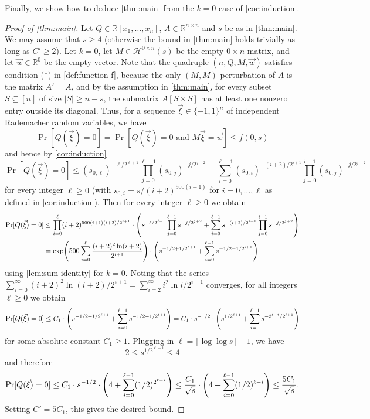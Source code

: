 \documentclass[english]{article}
\theoremstyle{remark}
\numberwithin{equation}{section}
\numberwithin{figure}{section}
\newcommand{\su}{\subseteq}
\newcommand{\RR}{\mathbb{R}}
\let\originalleft\left
\let\originalright\right
\renewcommand{\left}{\mathopen{}\mathclose\bgroup\originalleft}
\renewcommand{\right}{\aftergroup\egroup\originalright}
\begin{document}
Finally, we show how to deduce \cref{thm:main} from the $k=0$ case of \cref{cor:induction}.
\begin{proof}[Proof of \cref{thm:main}]
Let $Q\in \RR[x_1,\dots,x_n]$, $A\in \RR^{n\times n}$ and $s$ be as in \cref{thm:main}. We may assume that $s\ge 4$ (otherwise the bound in \cref{thm:main} holds trivially as long as $C'\ge 2$). Let $k=0$, let $M\in \mathcal{H}^{0\times n}(s)$ be the empty $0\times n$ matrix, and let $\vec w\in \RR^0$ be the empty vector. Note that the quadruple $(n,Q,M,\vec{w})$ satisfies  condition ($*$) in \cref{def:function-f}, because the only $(M,M)$-perturbation of $A$ is the matrix $A'=A$, and by the assumption in \cref{thm:main}, for every subset $S\su [n]$ of size $|S|\ge n-s$, the submatrix $A[S\times S]$ has at least one nonzero entry outside its diagonal. Thus, for a sequence $\vec \xi\in \{-1,1\}^n$ of independent Rademacher random variables, we have
\[\Pr[Q(\vec \xi)=0]=\Pr[Q(\vec{\xi})=0\text{ and }M\vec{\xi}=\vec w]\le f(0,s)\]
and hence by \cref{cor:induction}
\[\Pr[Q(\vec \xi)=0]\le (s_{0,\ell})^{-\ell/2^{\ell+1}}\prod_{j=0}^{\ell-1}(s_{0,j})^{-j/2^{j+2}}+\sum_{i=0}^{\ell-1}(s_{0,i})^{-(i+2)/2^{i+1}}\prod_{j=0}^{i-1}(s_{0,j})^{-j/2^{j+2}}\]
for every integer $\ell\ge 0$ (with $s_{0,i}=s/(i+2)^{500(i+1)}$ for $i=0,\dots,\ell$ as defined in \cref{cor:induction}). Then for every integer $\ell\ge 0$ we obtain
\begin{align*}
\Pr[Q(\vec \xi)=0]&\le \prod_{i=0}^{\ell}(i+2)^{500(i+1)(i+2)/2^{i+1}}\cdot \left(s^{-\ell/2^{\ell+1}}\prod_{j=0}^{\ell-1}s^{-j/2^{j+2}}+\sum_{i=0}^{\ell-1}s^{-(i+2)/2^{i+1}}\prod_{j=0}^{i-1}s^{-j/2^{j+2}}\right)\\
&= \exp\left(500\sum_{i=0}^{\ell}\frac{(i+2)^2\ln (i+2)}{2^{i+1}}\right)\cdot \left(s^{-1/2+1/2^{\ell+1}}+\sum_{i=0}^{\ell-1}s^{-1/2-1/2^{i+1}}\right)
\end{align*}
using \cref{lem:sum-identity} for $k=0$. Noting that the series $\sum_{i=0}^{\infty} (i+2)^2\ln (i+2)/2^{i+1}=\sum_{i=2}^{\infty} i^2\ln i/2^{i-1}$ converges, for all integers $\ell\ge 0$ we obtain
\[\Pr[Q(\vec \xi)=0]\le C_1\cdot \left(s^{-1/2+1/2^{\ell+1}}+\sum_{i=0}^{\ell-1}s^{-1/2-1/2^{i+1}}\right)=C_1\cdot s^{-1/2}\cdot \left(s^{1/2^{\ell+1}}+\sum_{i=0}^{\ell-1}s^{-2^{\ell-i}/2^{\ell+1}}\right)\]
for some absolute constant $C_1\ge 1$. Plugging in $\ell=\lfloor\log\log s\rfloor-1$, we have
\[2\le s^{1/2^{\ell+1}}\le 4\]
and therefore
\[\Pr[Q(\vec \xi)=0]\le C_1\cdot s^{-1/2}\cdot \left(4+\sum_{i=0}^{\ell-1}(1/2)^{2^{\ell-i}}\right)\le \frac{C_1}{\sqrt{s}}\cdot \left(4+\sum_{i=0}^{\ell-1}(1/2)^{\ell-i}\right)\le \frac{5C_1}{\sqrt{s}}.\]
Setting $C'=5C_1$, this gives the desired bound.
\end{proof}
\end{document}
